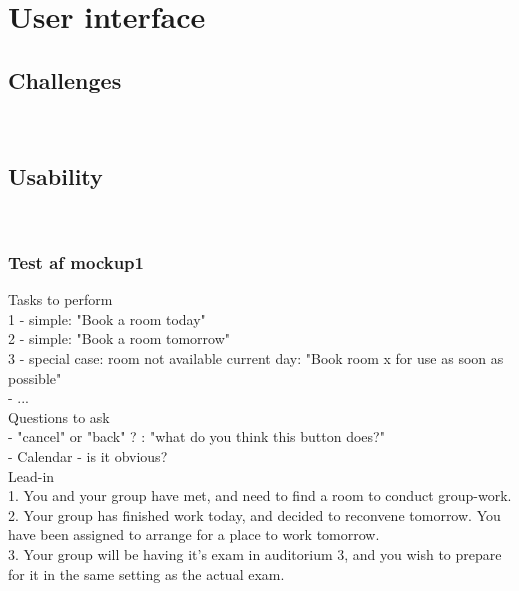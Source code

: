\chapter{User interface}
\label{chap:user_interface}

\section{Challenges}
\label{sec:challenges}
\\

\section{Usability}
\label{sec:usability}
\\
\subsection{Test af mockup1}

Tasks to perform\\
1 - simple: "Book a room today" \\
2 - simple: "Book a room tomorrow" \\
3 - special case: room not available current day: "Book room x for use as soon as possible" \\
- ... \\


Questions to ask \\
- "cancel" or "back" ? : "what do you think this button does?" \\
- Calendar - is it obvious? \\


Lead-in \\
1.
You and your group have met, and need to find a room to conduct group-work.\\

2.
Your group has finished work today, and decided to reconvene tomorrow. You have been assigned to arrange for a place to work tomorrow.\\

3.
Your group will be having it's exam in auditorium 3, and you wish to prepare for it in the same setting as the actual exam. \\


